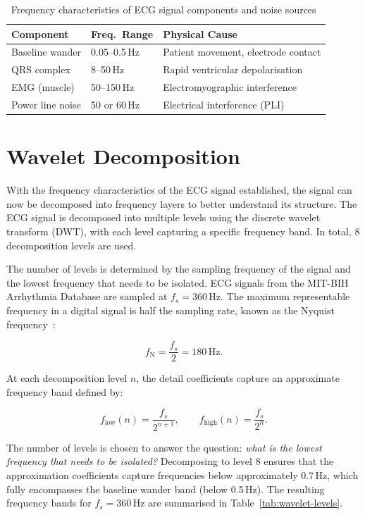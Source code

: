 \documentclass[11pt]{article}
\begin{document}
\begin{table}[htbp]
    \centering
    \begin{tabular}{lll}
        \toprule
        \textbf{Component} & \textbf{Freq.\ Range} & \textbf{Physical Cause} \\
        \midrule
        Baseline wander   & 0.05--0.5\,Hz   & Patient movement, electrode contact     \\
        QRS complex       & 8--50\,Hz       & Rapid ventricular depolarisation        \\
        EMG (muscle)      & 50--150\,Hz     & Electromyographic interference          \\
        Power line noise  & 50 or 60\,Hz    & Electrical interference (PLI)           \\
        \bottomrule
    \end{tabular}
    \caption{Frequency characteristics of ECG signal components and noise sources~\cite{luo_review_2010, tereshchenko_frequency_2015, xie_computational_2020}}
    \label{tab:ecg-components}
\end{table}


\section{Wavelet Decomposition}\label{sec:wavelet}

With the frequency characteristics of the ECG signal established, the signal can now be decomposed into frequency layers to better understand its structure. The ECG signal is decomposed into multiple levels using the discrete wavelet transform (DWT), with each level capturing a specific frequency band. In total, 8 decomposition levels are used.

The number of levels is determined by the sampling frequency of the signal and the lowest frequency that needs to be isolated. ECG signals from the MIT-BIH Arrhythmia Database are sampled at $f_s = 360$\,Hz. The maximum representable frequency in a digital signal is half the sampling rate, known as the Nyquist frequency~\cite{tereshchenko_frequency_2015, zidelmal_qrs_2012}:

$$f_\mathrm{N} = \frac{f_s}{2} = 180\,\text{Hz}.$$

At each decomposition level $n$, the detail coefficients capture an approximate frequency band defined by:

$$f_\text{low}(n) = \frac{f_s}{2^{n+1}}, \qquad f_\text{high}(n) = \frac{f_s}{2^{n}}.$$

The number of levels is chosen to answer the question: \textit{what is the lowest frequency that needs to be isolated?} Decomposing to level 8 ensures that the approximation coefficients capture frequencies below approximately 0.7\,Hz, which fully encompasses the baseline wander band (below 0.5\,Hz). The resulting frequency bands for $f_s = 360$\,Hz are summarised in Table~\ref{tab:wavelet-levels}.
\end{document}
